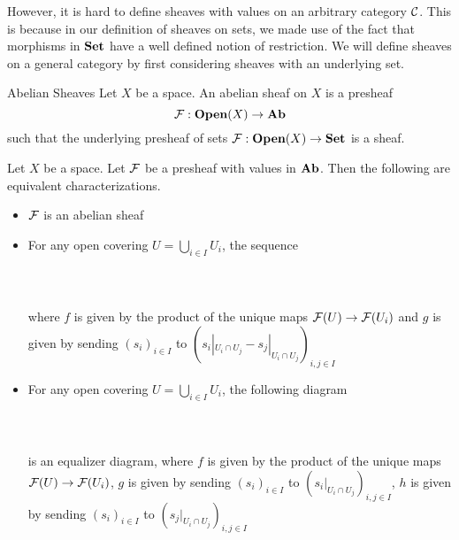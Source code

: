\documentclass[a4paper]{article}
\begin{document}
However, it is hard to define sheaves with values on an arbitrary category $\mathcal{C}$. This is because in our definition of sheaves on sets, we made use of the fact that morphisms in $\bold{Set}$ have a well defined notion of restriction. We will define sheaves on a general category by first considering sheaves with an underlying set. 

\begin{defn}{Abelian Sheaves}{} Let $X$ be a space. An abelian sheaf on $X$ is a presheaf $$\mathcal{F}:\bold{Open}(X)\to\bold{Ab}$$ such that the underlying presheaf of sets $\mathcal{F}:\bold{Open}(X)\to\bold{Set}$ is a sheaf. 
\end{defn}

\begin{thm}{}{} Let $X$ be a space. Let $\mathcal{F}$ be a presheaf with values in $\bold{Ab}$. Then the following are equivalent characterizations. 
\begin{itemize}
\item $\mathcal{F}$ is an abelian sheaf
\item For any open covering $U=\bigcup_{i\in I}U_i$, the sequence \\~\\
\\~\\
where $f$ is given by the product of the unique maps $\mathcal{F}(U)\to\mathcal{F}(U_i)$ and $g$ is given by sending $(s_i)_{i\in I}$ to $(s_i|_{U_i\cap U_j}-s_j|_{U_i\cap U_j})_{i,j\in I}$
\item For any open covering $U=\bigcup_{i\in I}U_i$, the following diagram \\~\\
\\~\\
is an equalizer diagram, where $f$ is given by the product of the unique maps $\mathcal{F}(U)\to\mathcal{F}(U_i)$, $g$ is given by sending $(s_i)_{i\in I}$ to $(s_i|_{U_i\cap U_j})_{i,j\in I}$, $h$ is given by sending $(s_i)_{i\in I}$ to $(s_j|_{U_i\cap U_j})_{i,j\in I}$
\end{itemize}
\end{thm}
\end{document}
